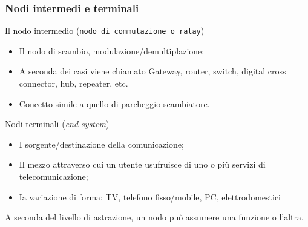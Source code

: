 \subsubsection{Nodi intermedi e terminali}
\label{sec:nodiintermedi}
Il nodo intermedio (\texttt{nodo di commutazione o ralay})
\begin{itemize}
\item Il nodo di scambio, modulazione/demultiplazione;
\item A seconda dei casi viene chiamato Gateway, router, switch, digital cross
  connector, hub, repeater, etc.
\item Concetto simile a quello di parcheggio scambiatore.
\end{itemize}
Nodi terminali ({\it end system})
\begin{itemize}
\item I sorgente/destinazione della comunicazione;
\item Il mezzo attraverso cui un utente usufruisce di uno o più servizi di
  telecomunicazione;
\item Ia variazione di forma: TV, telefono fisso/mobile, PC, elettrodomestici
\end{itemize}
A seconda del livello di astrazione, un nodo può assumere una funzione o l'altra.

